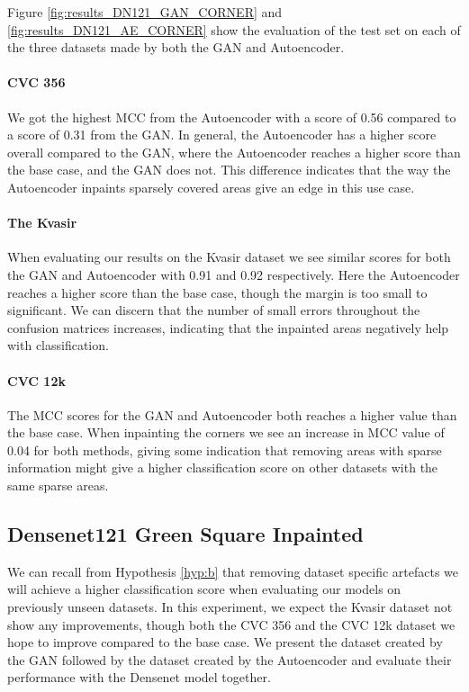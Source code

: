 %
\noindent Figure \ref{fig:results_DN121_GAN_CORNER} and \ref{fig:results_DN121_AE_CORNER} show the evaluation of the test set on each of the three datasets made by both the GAN and Autoencoder. 

\paragraph{CVC 356}
We got the highest MCC from the Autoencoder with a score of 0.56 compared to a score of 0.31 from the GAN.
In general, the Autoencoder has a higher score overall compared to the GAN, where the Autoencoder reaches a higher score than the base case, and the GAN does not.
This difference indicates that the way the Autoencoder inpaints sparsely covered areas give an edge in this use case. 


\paragraph{The Kvasir}
When evaluating our results on the Kvasir dataset we see similar scores for both the GAN and Autoencoder with 0.91 and 0.92 respectively. Here the Autoencoder reaches a higher score than the base case, though the margin is too small to significant.
We can discern that the number of small errors throughout the confusion matrices increases, indicating that the inpainted areas negatively help with classification.

\paragraph{CVC 12k}
The MCC scores for the GAN and Autoencoder both reaches a higher value than the base case. When inpainting the corners we see an increase in MCC value of 0.04 for both methods, giving some indication that removing areas with sparse information might give a higher classification score on other datasets with the same sparse areas.






\subsection{Densenet121 Green Square Inpainted}


We can recall from Hypothesis \ref{hyp:b} that removing dataset specific artefacts we will achieve a higher classification score when evaluating our models on previously unseen datasets.
In this experiment, we expect the Kvasir dataset not show any improvements, though both the CVC 356 and the CVC 12k dataset we hope to improve compared to the base case. 
We present the dataset created by the GAN followed by the dataset created by the Autoencoder and evaluate their performance with the Densenet model together.


